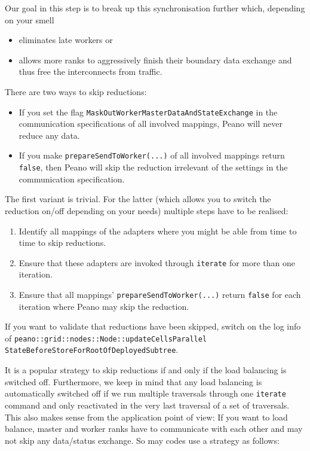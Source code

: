 Our goal in this step is to break up this synchronisation further which,
depending on your smell
\begin{itemize}
  \item eliminates late workers or
  \item allows more ranks to aggressively finish their boundary data exchange
  and thus free the interconnects from traffic.
\end{itemize}


\noindent
There are two ways to skip reductions:
\begin{itemize}
  \item If you set the flag \texttt{MaskOutWorkerMasterDataAndStateExchange}
  in the communication specifications of all involved mappings, Peano will never
  reduce any data.
  \item If you make \texttt{prepareSendToWorker(...)} of all involved mappings
  return \texttt{false}, then Peano will skip the reduction irrelevant of the
  settings in the communication specification.
\end{itemize}


\noindent
The first variant is trivial. For the latter (which allows you to switch the
reduction on/off depending on your needs) multiple steps have to be realised:


\begin{enumerate}
  \item Identify all mappings of the adapters where you might be able from time
  to time to skip reductions.
  \item Ensure that these adapters are invoked through \texttt{iterate} for more
  than one iteration.
  \item Ensure that all mappings' \texttt{prepareSendToWorker(...)} return
  \texttt{false} for each iteration where Peano may skip the reduction.
\end{enumerate}

  
\begin{remark}
  If you want to validate that reductions have been skipped, switch on the log
  info of 
  \texttt{peano::grid::nodes::Node::updateCellsParallel}
  \texttt{StateBeforeStoreForRootOfDeployedSubtree}.
\end{remark}

\noindent
It is a popular strategy to skip reductions if and only if the load balancing is
switched off.
Furthermore, we keep in mind that any load balancing is automatically
switched off if we run multiple traversals through one \texttt{iterate} command
and only reactivated in the very last traversal of a set of traversals.
This also makes sense from the application point of view:
If you want to load balance, master and worker ranks have to communicate with
each other and may not skip any data/status exchange.
So may codes use a strategy as follows:

